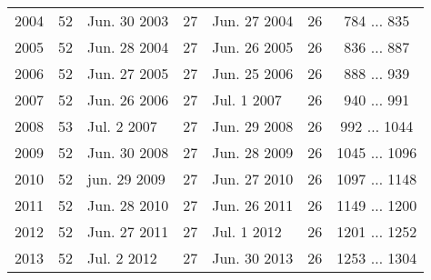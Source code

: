 \begin{table}[ht]
\begin{center}
\begin{tabular}{cclclcc}
2004 & 52 & Jun. 30 2003 & 27 & Jun. 27 2004 & 26 &  784 $\ldots$  835 \\
2005 & 52 & Jun. 28 2004 & 27 & Jun. 26 2005 & 26 &  836 $\ldots$  887 \\
2006 & 52 & Jun. 27 2005 & 27 & Jun. 25 2006 & 26 &  888 $\ldots$  939 \\
2007 & 52 & Jun. 26 2006 & 27 & Jul.  1 2007 & 26 &  940 $\ldots$  991 \\
2008 & 53 & Jul.  2 2007 & 27 & Jun. 29 2008 & 26 &  992 $\ldots$ 1044 \\
2009 & 52 & Jun. 30 2008 & 27 & Jun. 28 2009 & 26 & 1045 $\ldots$ 1096 \\
2010 & 52 & jun. 29 2009 & 27 & Jun. 27 2010 & 26 & 1097 $\ldots$ 1148 \\
2011 & 52 & Jun. 28 2010 & 27 & Jun. 26 2011 & 26 & 1149 $\ldots$ 1200 \\
2012 & 52 & Jun. 27 2011 & 27 & Jul.  1 2012 & 26 & 1201 $\ldots$ 1252 \\
2013 & 52 & Jul.  2 2012 & 27 & Jun. 30 2013 & 26 & 1253 $\ldots$ 1304 \\
  \bottomrule
\end{tabular}

\end{center}
\end{table}


